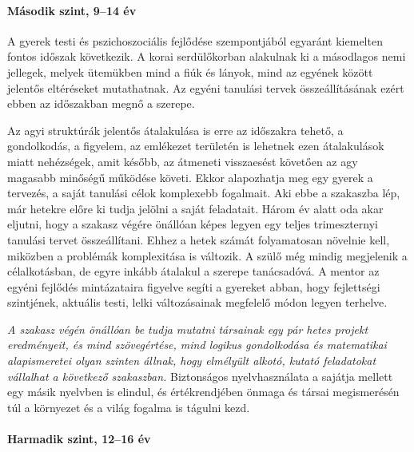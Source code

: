 \begin{spacing}{0.99}
\paragraph{Második szint, 9--14 év}

A gyerek testi és pszichoszociális fejlődése szempontjából egyaránt kiemelten fontos időszak következik. A korai serdülőkorban alakulnak ki a másodlagos nemi jellegek, melyek ütemükben mind a fiúk és lányok, mind az egyének között jelentős eltéréseket mutathatnak. Az egyéni tanulási tervek összeállításának ezért ebben az időszakban megnő a szerepe.

Az agyi struktúrák jelentős átalakulása is erre az időszakra tehető, a gondolkodás, a figyelem, az emlékezet területén is lehetnek ezen átalakulások miatt nehézségek, amit később, az átmeneti visszaesést követően az agy magasabb minőségű működése követi. Ekkor alapozhatja meg egy gyerek a tervezés, a saját tanulási célok komplexebb fogalmait. Aki ebbe a szakaszba lép, már hetekre előre ki tudja jelölni a saját feladatait. Három év alatt oda akar eljutni, hogy a szakasz végére önállóan képes legyen egy teljes trimeszternyi tanulási tervet összeállítani. Ehhez a hetek számát folyamatosan növelnie kell, miközben a problémák komplexitása is változik. A szülő még mindig megjelenik a célalkotásban, de egyre inkább átalakul a szerepe tanácsadóvá. A mentor az egyéni fejlődés mintázataira figyelve segíti a gyereket abban, hogy fejlettségi szintjének, aktuális testi, lelki változásainak megfelelő módon legyen terhelve.

\emph{A szakasz végén önállóan be tudja mutatni társainak egy pár hetes projekt eredményeit, és mind szövegértése, mind logikus gondolkodása és matematikai alapismeretei olyan szinten állnak, hogy elmélyült alkotó, kutató feladatokat vállalhat a következő szakaszban.} Biztonságos nyelvhasználata a sajátja mellett egy másik nyelvben is elindul, és értékrendjében önmaga és társai megismerésén túl a környezet és a világ fogalma is tágulni kezd.

\paragraph{Harmadik szint, 12--16 év}


\end{spacing}

